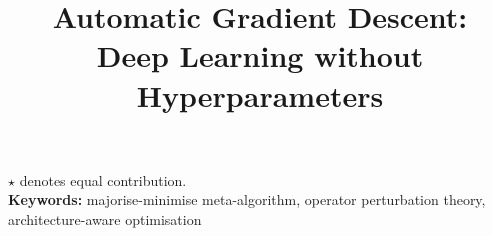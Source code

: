 \documentclass[10pt]{article}
\title{Automatic Gradient Descent:\\Deep Learning without Hyperparameters}
\author{\sffamily\auth{Jeremy Bernstein$^\star$}{MIT}\authspace\auth{\hspace{-5pt}Chris Mingard$^\star$}{\hspace{-5pt}U.\ Oxford}\authspace\auth{Kevin Huang}{U.\ Washington}\authspace\auth{Navid Azizan}{MIT} \authspace\auth{Yisong Yue}{Caltech}}
\begin{document}
\maketitle
\thispagestyle{empty}

\vspace{-5ex}
\hfill$\star$ denotes equal contribution.\\


{\sffamily\textbf{Keywords:}} majorise-minimise meta-algorithm, operator perturbation theory, architecture-aware optimisation

\sffamily
{}
\tableofcontents
{}
\normalfont













\newpage
\appendix

\end{document}
